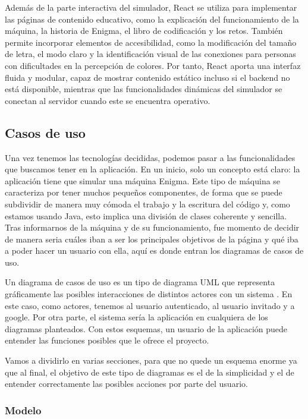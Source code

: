 Además de la parte interactiva del simulador, React se utiliza para implementar las páginas de contenido educativo, como la explicación del funcionamiento de la máquina, la historia de Enigma, el libro de codificación y los retos. También permite incorporar elementos de accesibilidad, como la modificación del tamaño de letra, el modo claro y la identificación visual de las conexiones para personas con dificultades en la percepción de colores.
Por tanto, React aporta una interfaz fluida y modular, capaz de mostrar contenido estático incluso si el backend no está disponible, mientras que las funcionalidades dinámicas del simulador se conectan al servidor cuando este se encuentra operativo.

\subsection {Casos de uso}
Una vez tenemos las tecnologías decididas, podemos pasar a las funcionalidades que buscamos tener en la aplicación. En un inicio, solo un concepto está claro: la aplicación tiene que simular una máquina Enigma. Este tipo de máquina se caracteriza por tener muchos pequeños componentes, de forma que se puede subdividir de manera muy cómoda el trabajo y la escritura del código y, como estamos usando Java, esto implica una división de clases coherente y sencilla. Tras informarnos de la máquina y de su funcionamiento, fue momento de decidir de manera seria cuáles iban a ser los principales objetivos de la página y qué iba a poder hacer un usuario con ella, aquí es donde entran los diagramas de casos de uso. 

Un diagrama de casos de uso es un tipo de diagrama UML que representa gráficamente las posibles interacciones de distintos actores con un sistema \cite{wiki_casos_uso}. En este caso, como actores, tenemos al usuario autenticado, al usuario invitado y a google. Por otra parte, el sistema sería la aplicación en cualquiera de los diagramas planteados.
Con estos esquemas, un usuario de la aplicación puede entender las funciones posibles que le ofrece el proyecto.

Vamos a dividirlo en varias secciones, para que no quede un esquema enorme ya que al final, el objetivo de este tipo de diagramas es el de la simplicidad y el de entender correctamente las posibles acciones por parte del usuario.

\subsubsection{Modelo}

